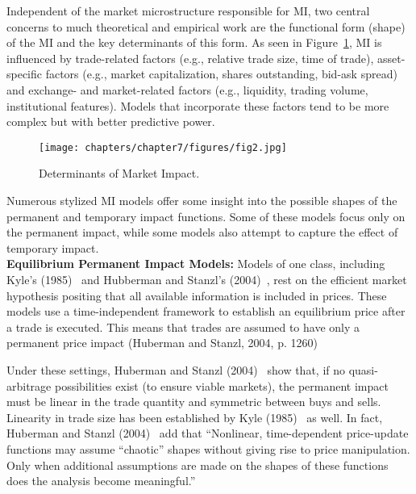Independent of the market microstructure responsible for MI, two central concerns to much theoretical and empirical work are the functional form (shape) of the MI and the key determinants of this form. As seen in Figure~\ref{fig:detmarketimpt}, MI is influenced by trade-related factors (e.g., relative trade size, time of trade), asset-specific factors (e.g., market capitalization, shares outstanding, bid-ask spread) and exchange- and market-related factors (e.g., liquidity, trading volume, institutional features). Models that incorporate these factors tend to be more complex but with better predictive power.
	\begin{figure}[!ht]
	\centering
	\texttt{[image: chapters/chapter7/figures/fig2.jpg]}
	\caption{Determinants of Market Impact. \label{fig:detmarketimpt}}
	\end{figure}
Numerous stylized MI models offer some insight into the possible shapes of the permanent and temporary impact functions. Some of these models focus only on the permanent impact, while some models also attempt to capture the effect of temporary impact. \\


\noindent \textbf{Equilibrium Permanent Impact Models:} Models of one class, including Kyle's (1985)~\cite{kyle1985} and Hubberman and Stanzl's (2004)~\cite{huberstan}, rest on the efficient market hypothesis positing that all available information is included in prices. These models use a time-independent framework to establish an equilibrium price after a trade is executed. This means that trades are assumed to have only a permanent price impact (Huberman and Stanzl, 2004, p. 1260)~\cite{huberstan}


Under these settings, Huberman and Stanzl (2004)~\cite{huberstan} show that, if no quasi-arbitrage possibilities exist (to ensure viable markets), the permanent impact must be linear in the trade quantity and symmetric between buys and sells. Linearity in trade size has been established by Kyle (1985)~\cite{kyle1985} as well. In fact, Huberman and Stanzl (2004)~\cite{huberstan} add that ``Nonlinear, time-dependent price-update functions may assume ``chaotic'' shapes without giving rise to price manipulation. Only when additional assumptions are made on the shapes of these functions does the analysis become meaningful.''


